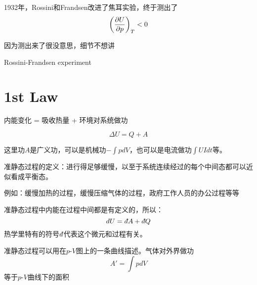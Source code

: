 \documentclass[CJK]{beamer}
\begin{document}
\begin{frame}
\bch
1932年，Rossini和Frandsen改进了焦耳实验，终于测出了
$$\left(\frac{\partial U}{\partial p}\right)_{T} < 0 $$

\skiplines

因为测出来了很没意思，细节不想讲\bye
\ech
\end{frame}

\begin{frame}
\bch
{}
\emini
{}
Rossini-Frandsen experiment

\emini

\ech
\end{frame}

\section{1st Law}



\begin{frame}
\bch
内能变化 = 吸收热量 + 环境对系统做功

$$ \Delta U =  Q + A $$

\skiplines

这里功$A$是{\blue 广义功}，可以是机械功$-\int pdV$，也可以是电流做功$\int UIdt$等。
\ech
\end{frame}

\begin{frame}
\bch
准静态过程的定义：{\blue 进行得足够缓慢，以至于系统连续经过的每个中间态都可以近似看成平衡态。}

\skiplines

{\small 例如：缓慢加热的过程，缓慢压缩气体的过程，政府工作人员的办公过程等等}


\ech
\end{frame}


\begin{frame}
\bch
{\large
准静态过程中内能在过程中间都是有定义的，所以：
{\blue
$$dU = \dbar A + \dbar Q$$
}
热学里特有的符号$\dbar$代表这个微元和过程有关。
}
\ech
\end{frame}


\begin{frame}
\bch
准静态过程可以用在$p$-$V$图上的一条曲线描述。气体对外界做功
$$ A' = \int p dV $$
等于$p$-$V$曲线下的面积

\ech
\end{frame}
\end{document}
